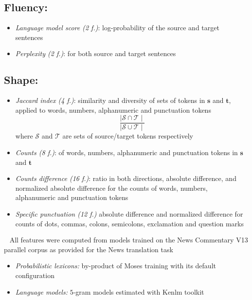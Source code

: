 \documentclass[a0]{sciposter}
\begin{document}
\begin{multicols*}{2}
\subsection*{Fluency:} 
\begin{itemize}
  \item \textit{Language model score (2 f.)}: log-probability of the source and target sentences
  \item \textit{Perplexity (2 f.)}: for both source and target sentences
\end{itemize}

\subsection*{Shape:}
\begin{itemize}
  \item \textit{Jaccard index (4 f.)}: similarity and diversity of sets of tokens in $\mathbf{s}$ and $\mathbf{t}$, applied to words, numbers, alphanumeric and punctuation tokens
  $$ \frac{\mid \mathcal{S}\cap \mathcal{T}\mid}{\mid \mathcal{S}\cup \mathcal{T}\mid}$$
  where $\mathcal{S}$ and $\mathcal{T}$ are sets of source/target tokens respectively
  \item \textit{Counts (8 f.)}: of words, numbers, alphanumeric and punctuation tokens in $\mathbf{s}$ and $\mathbf{t}$ \cite{Specia15}
  \item \textit{Counts difference (16 f.)}: ratio in both directions, absolute difference, and normalized absolute difference for the counts of words, numbers, alphanumeric and punctuation tokens
  \item \textit{Specific punctuation (12 f.)} absolute difference and normalized difference for counts of dots, commas, colons, semicolons, exclamation and question marks
\end{itemize}

~\newline
All features were computed from models trained on the News Commentary V13 parallel corpus as provided for the News translation task
\begin{itemize}
  \item \textit{Probabilistic lexicons:} by-product of Moses training with its default configuration
  \item \textit{Language models:} $5$-gram models estimated with Kenlm toolkit
\end{itemize}



\end{multicols*}
\end{document}
